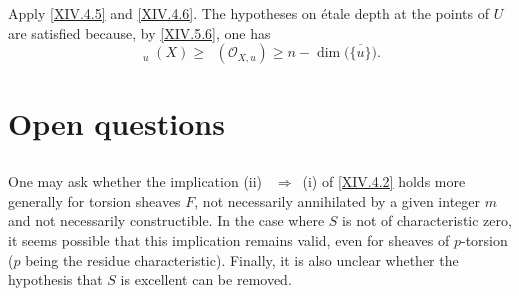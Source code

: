 \documentclass[11pt,a4paper,oneside]{book}
\providecommand{\sisi}[2]{#2}
\providecommand{\Oo}{\mathcal O}
\DeclareMathOperator{\profet}{prof\;\acute{e}t}
\DeclareMathOperator{\profgeom}{prof\;g\acute{e}om}
\providecommand{\ALORS}{\unskip~$\Longrightarrow$~\ignorespaces}
\theoremstyle{plain}
\theoremstyle{definition}
\theoremstyle{remark}
\renewcommand{\Ref}[1]{\textup{\ref{#1}}}
\begin{document}
Apply \Ref{XIV.4.5} and \Ref{XIV.4.6}. The hypotheses on \'{e}tale depth at the points of $U$ are satisfied because, by \Ref{XIV.5.6}, one has \sisi{$$
\profet_{u}(X)\geq\profgeom\Oo_{X, u}\geq n-\dim\big(\overline{\{ u\} }\big).
$$
}{$$
\profet_{u}(X)\geq\profgeom(\Oo_{X, u})\geq n-\dim\big(\overline{\{ u\} }\big).
$$
}
\enlargethispage{\baselineskip}%

\section{Open questions} \label{XIV.6}

\subsection{\texorpdfstring{}{XIV.6.1}} \label{XIV.6.1} One may ask whether the implication \textup{(ii)} \ALORS \textup{(i)} of \Ref{XIV.4.2} holds more generally for torsion sheaves $F$, not necessarily annihilated by a given integer $m$ and not necessarily constructible\unskip\marginpar{\raggedright\footnotesize\bfseries\thepageoriginal}\nobreak. In the case where $S$ is not of characteristic zero, it seems possible that this implication remains valid, even for sheaves of $p$-torsion ($p$ being the residue characteristic). Finally, it is also unclear whether the hypothesis that $S$ is excellent can be removed.
\end{document}
